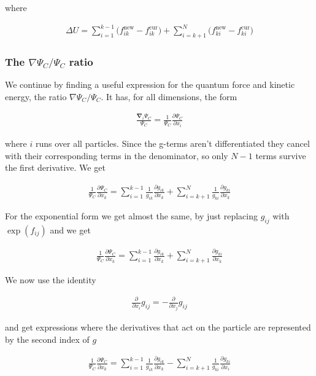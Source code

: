 \documentclass[11pt]{article}
\begin{document}
			where

			\begin{align}
				\Delta U =
				\sum_{i=1}^{k-1}\big(f_{ik}^\mathrm{new}-f_{ik}^\mathrm{cur}\big)
				+
				\sum_{i=k+1}^{N}\big(f_{ki}^\mathrm{new}-f_{ki}^\mathrm{cur}\big)
			\end{align}

		\subsubsection{The $\nabla \Psi_{C}/\Psi_{C}$ ratio}
			We continue by finding a useful expression for the quantum force and kinetic energy, the ratio $\nabla\Psi_{C}/\Psi_{C}$. It has,
			for all dimensions, the form

			\begin{align}
				\frac{\mathbf{\nabla}_{i}\Psi_{C}}{\Psi_{C}}=\frac{1}{\Psi_{C}}\frac{\partial\Psi_{C}}{\partial x_{i}}
			\end{align}

			where $i$ runs over all particles. Since the g-terms aren't differentiated
			they cancel with their corresponding terms in the denominator, so
			only $N-1$ terms survive the first derivative. We get

			\begin{align}
				\frac{1}{\Psi_{C}}\frac{\partial\Psi_{C}}{\partial x_{k}}=\sum_{i=1}^{k-1}\frac{1}{g_{ik}}\frac{\partial g_{ik}}{\partial x_{k}}+\sum_{i=k+1}^{N}\frac{1}{g_{ki}}\frac{\partial g_{ki}}{\partial x_{k}}
			\end{align}

			For the exponential form we get almost the same, by just replacing
			$g_{ij}$ with $\exp\left(f_{ij}\right)$ and we get

			\begin{align}
				\frac{1}{\Psi_{C}}\frac{\partial\Psi_{C}}{\partial x_{k}}=\sum_{i=1}^{k-1}\frac{\partial g_{ik}}{\partial x_{k}}+\sum_{i=k+1}^{N}\frac{\partial g_{ki}}{\partial x_{k}}
			\end{align}

			We now use the identity

			\begin{align}
				\frac{\partial}{\partial x_{i}}g_{ij}=-\frac{\partial}{\partial x_{j}}g_{ij}
			\end{align}

			and get expressions where the derivatives that act on the particle
			are represented by the second index of $g$

			\begin{align}
				\frac{1}{\Psi_{C}}\frac{\partial\Psi_{C}}{\partial x_{k}}=\sum_{i=1}^{k-1}\frac{1}{g_{ik}}\frac{\partial g_{ik}}{\partial x_{k}}-\sum_{i=k+1}^{N}\frac{1}{g_{ki}}\frac{\partial g_{ki}}{\partial x_{i}}
			\end{align}
\end{document}
